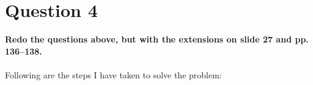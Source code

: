 \chapter{Question 4}
\label{available-representation}

\textbf{Redo the questions above, but with the extensions on slide 27 and pp. 136--138.}\\\\

Following are the steps I have taken to solve the problem:
